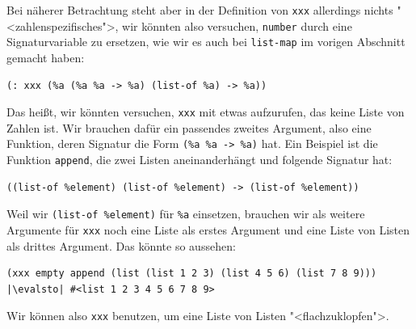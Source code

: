 %
Bei näherer Betrachtung steht aber in der Definition von
\lstinline{xxx} allerdings nichts "<zahlenspezifisches">, wir könnten
also versuchen, \lstinline{number} durch eine Signaturvariable zu
ersetzen, wie wir es auch bei \lstinline{list-map} im vorigen
Abschnitt gemacht haben:
%
\begin{lstlisting}
(: xxx (%a (%a %a -> %a) (list-of %a) -> %a))
\end{lstlisting}
%
Das heißt, wir könnten versuchen, \lstinline{xxx} mit etwas
aufzurufen, das keine Liste von Zahlen ist.  Wir brauchen dafür ein
passendes zweites Argument, also eine
Funktion, deren Signatur die Form \lstinline{(%a %a -> %a)} hat.  Ein
Beispiel ist die Funktion \lstinline{append}, die zwei Listen
aneinanderhängt und folgende Signatur hat:
%
\begin{lstlisting}
((list-of %element) (list-of %element) -> (list-of %element))
\end{lstlisting}
% 
Weil wir \lstinline{(list-of %element)} für \lstinline{%a} einsetzen,
brauchen wir als weitere Argumente für \lstinline{xxx} noch eine
Liste als erstes Argument und eine Liste von Listen als drittes
Argument.  Das könnte so aussehen:
%
\begin{lstlisting}
(xxx empty append (list (list 1 2 3) (list 4 5 6) (list 7 8 9)))
|\evalsto| #<list 1 2 3 4 5 6 7 8 9>
\end{lstlisting}
%
Wir können also \lstinline{xxx} benutzen, um eine Liste von Listen
"<flachzuklopfen">.

